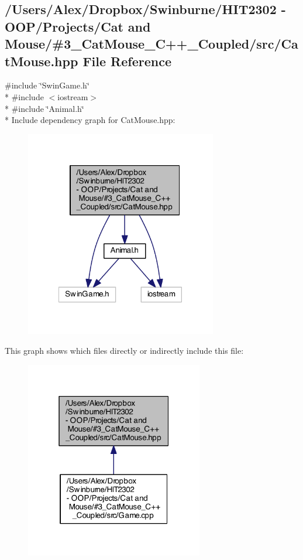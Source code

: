 \subsection{/\-Users/\-Alex/\-Dropbox/\-Swinburne/\-H\-I\-T2302 -\/ O\-O\-P/\-Projects/\-Cat and Mouse/\#3\-\_\-\-Cat\-Mouse\-\_\-\-C++\-\_\-\-Coupled/src/\-Cat\-Mouse.hpp File Reference}
\label{_cat_mouse_8hpp}
{\ttfamily \#include \char`\"{}Swin\-Game.\-h\char`\"{}}\\*
{\ttfamily \#include $<$iostream$>$}\\*
{\ttfamily \#include \char`\"{}Animal.\-h\char`\"{}}\\*
Include dependency graph for Cat\-Mouse.\-hpp\-:
\nopagebreak
\begin{figure}[H]
\begin{center}
\leavevmode
\includegraphics[width=237pt]{_cat_mouse_8hpp__incl}
\end{center}
\end{figure}
This graph shows which files directly or indirectly include this file\-:
\nopagebreak
\begin{figure}[H]
\begin{center}
\leavevmode
\includegraphics[width=220pt]{_cat_mouse_8hpp__dep__incl}
\end{center}
\end{figure}

